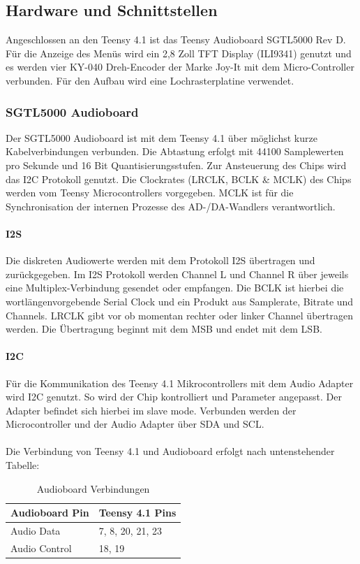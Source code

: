\documentclass[12pt]{article}
\begin{document}
\newpage

\subsection{Hardware und Schnittstellen}
Angeschlossen an den Teensy 4.1 ist das Teensy Audioboard SGTL5000 Rev D. 
Für die Anzeige des Menüs wird ein 2,8 Zoll TFT Display (ILI9341) 
genutzt und es werden vier KY-040 Dreh-Encoder der Marke Joy-It mit dem Micro-Controller verbunden. 
Für den Aufbau wird eine Lochrasterplatine verwendet. 

\subsubsection{SGTL5000 Audioboard}
Der SGTL5000 Audioboard ist mit dem Teensy 4.1 über möglichst kurze Kabelverbindungen verbunden. 
Die Abtastung erfolgt mit 44100 Samplewerten pro Sekunde und 16 Bit Quantisierungsstufen. 
Zur Ansteuerung des Chips wird das I2C Protokoll genutzt. 
Die Clockrates (LRCLK, BCLK \& MCLK) des Chips werden vom Teensy Microcontrollers vorgegeben. 
MCLK ist für die Synchronisation der internen Prozesse des AD-/DA-Wandlers verantwortlich.  
\paragraph{I2S}
Die diskreten Audiowerte werden mit dem Protokoll I2S übertragen und zurückgegeben. 
Im I2S Protokoll werden Channel L und Channel R über jeweils eine Multiplex-Verbindung gesendet oder empfangen. 
Die BCLK ist hierbei die wortlängenvorgebende Serial Clock und ein Produkt aus Samplerate, Bitrate und Channels. 
LRCLK gibt vor ob momentan rechter oder linker Channel übertragen werden. 
Die Übertragung beginnt mit dem MSB und endet mit dem LSB.
\paragraph{I2C}
Für die Kommunikation des Teensy 4.1 Mikrocontrollers mit dem Audio Adapter wird I2C genutzt. So wird der Chip kontrolliert und Parameter angepasst. 
Der Adapter befindet sich hierbei im \glq slave mode\grq{}. Verbunden werden der Microcontroller und der Audio Adapter über SDA und SCL. 
\\
\\  
Die Verbindung von Teensy 4.1 und Audioboard erfolgt nach untenstehender Tabelle:


\begin{table}[h]
  \centering
  \caption{Audioboard Verbindungen}
  \label{tbl:audioboardverbindungen}
  \begin{tabular}{l|l}
    \textbf{Audioboard Pin}  & \textbf{Teensy 4.1 Pins}\\
    \hline
    Audio Data & 7, 8, 20, 21, 23\\
 
    Audio Control	 & 18, 19\\
 
   

  \end{tabular}    

\end{table}
\end{document}
